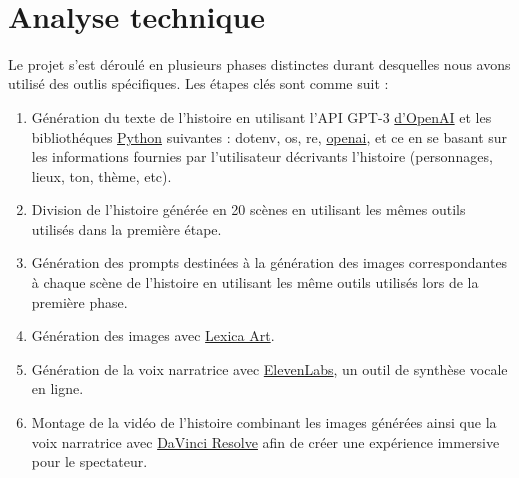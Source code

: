 \documentclass[11,5pt]{report}
\begin{document}
\begin{spacing}{2}
\begin{minipage}{\linewidth}
	\label{f3}%
\end{minipage}\\

\section{Analyse technique}
Le projet s'est déroulé en plusieurs phases distinctes durant desquelles nous avons utilisé des outlis spécifiques. Les étapes clés sont comme suit : 
\begin{enumerate}
    \item Génération du texte de l'histoire en utilisant l'API GPT-3 \hyperref[sec:GP]{d'OpenAI} et les bibliothéques \hyperref[sec:Py]{Python} suivantes : dotenv, os, re, \hyperref[sec:GP]{openai}, et ce en se basant sur les informations fournies par l'utilisateur décrivants l'histoire (personnages, lieux, ton, thème, etc).
    \item Division de l'histoire générée en 20 scènes en utilisant les mêmes outils utilisés dans la première étape.
    \item Génération des prompts destinées à la génération des images correspondantes à chaque scène de l'histoire en utilisant les même outils utilisés lors de la première phase.
    \item Génération des images avec \hyperref[sec:Lex]{Lexica Art}.
    \item Génération de la voix narratrice avec \hyperref[sec:El]{ElevenLabs}, un outil de synthèse vocale en ligne.
    \item Montage de la vidéo de l'histoire combinant les images générées ainsi que la voix narratrice avec \hyperref[sec:dav]{DaVinci Resolve} afin de créer une expérience immersive pour le spectateur.
\end{enumerate}


\end{spacing}
\end{document}
